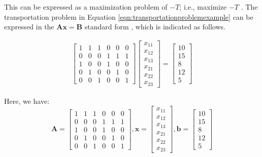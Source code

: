 \documentclass[letter,12pt]{article}
\begin{document}
This can be expressed as a maximization problem of $-T$; i.e., maximize $-T$ \cite[\S22.2, pp. 957]{Kreyszig2011}\cite[\S4.3, pp. 146]{Boyd2004}. The transportation problem in Equation \ref{eqn:transportationproblemexample} can be expressed in the $\mathbf{Ax = B}$ standard form \cite[\S2.1, pp.27--28]{Papadimitriou1998} \cite[\S4.3, pp. 146--147]{Boyd2004} \cite[\S11.2.1, pp. 322--323]{Antoniou2007}, which is indicated as follows.

\begin{eqnarray}
\label{eqn:transportationproblemexampleaxeqb}
\left[
\begin{array}{cccccc}
1 & 1 & 1 & 0 & 0 & 0 \\
0 & 0 & 0 & 1 & 1 & 1 \\
1 & 0 & 0 & 1 & 0 & 0 \\
0 & 1 & 0 & 0 & 1 & 0 \\
0 & 0 & 1 & 0 & 0 & 1
\end{array}
\right]
\left[
\begin{array}{cccccc}
x_{11} \\
x_{12} \\
x_{13} \\
x_{21} \\
x_{22} \\
x_{23}
\end{array}
\right]
=
\left[
\begin{array}{cccccc}
10 \\
15 \\
8 \\
12 \\
5
\end{array}
\right]
\end{eqnarray}

Here, we have:
\[
\mathbf{A} = 
\left[
\begin{array}{cccccc}
1 & 1 & 1 & 0 & 0 & 0 \\
0 & 0 & 0 & 1 & 1 & 1 \\
1 & 0 & 0 & 1 & 0 & 0 \\
0 & 1 & 0 & 0 & 1 & 0 \\
0 & 0 & 1 & 0 & 0 & 1
\end{array}
\right],
\mathbf{x} = 
\left[
\begin{array}{cccccc}
x_{11} \\
x_{12} \\
x_{13} \\
x_{21} \\
x_{22} \\
x_{23}
\end{array}
\right],
\mathbf{b} =
\left[
\begin{array}{cccccc}
10 \\
15 \\
8 \\
12 \\
5
\end{array}
\right]
\] 
\end{document}
